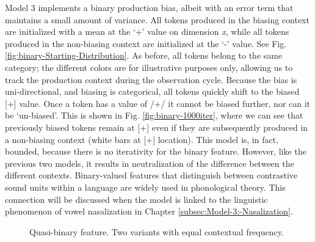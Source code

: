 Model 3 implements a binary production bias, albeit with an error
term that maintains a small amount of variance. All tokens produced
in the biasing context are initialized with a mean at the `+' value
on dimension \emph{x}, while all tokens produced in the non-biasing
context are initialized at the `-' value. See Fig. \ref{fig:binary-Starting-Distribution}.
As before, all tokens belong to the same category; the different colors
are for illustrative purposes only, allowing us to track the production
context during the observation cycle. Because the bias is uni-directional,
and biasing is categorical, all tokens quickly shift to the biased
{[}+{]} value. Once a token has a value of /+/ it cannot be biased
further, nor can it be `un-biased'. This is shown in Fig. \ref{fig:binary-1000iter},
where we can see that previously biased tokens remain at {[}+{]} even
if they are subsequently produced in a non-biasing context (white
bars at {[}+{]} location). This model is, in fact, bounded, because
there is no iterativity for the binary feature. However, like the
previous two models, it results in neutralization of the difference
between the different contexts. Binary-valued features that distinguish
between contrastive sound units within a language are widely used
in phonological theory. This connection will be discussed when the
model is linked to the linguistic phenomenon of vowel nasalization
in Chapter \ref{subsec:Model-3:-Nasalization}.

\begin{figure}[H]

\hfill{}\caption{\label{fig:Context Mismatch Features}Quasi-binary feature. Two variants
with equal contextual frequency.}

\end{figure}
